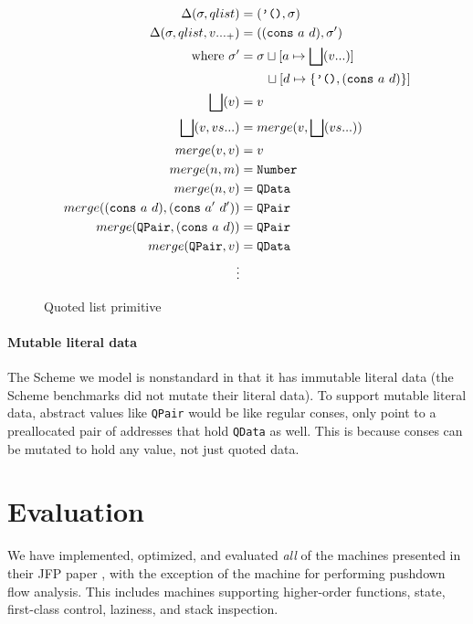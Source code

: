 \documentclass[preprint,onecolumn,9pt]{sigplanconf} %
\begin{document}
\begin{figure}
\begin{align*}
\Delta(\sigma, qlist) &= (\mbox{{\tt '()}}, \sigma) \\
\Delta(\sigma, qlist, v ..._+) &= (({\tt cons}\ a\ d), \sigma') \\
\qquad \mbox{where } \sigma' &= \sigma\sqcup[a \mapsto \bigsqcup(v ...)] \\
                            &\qquad \sqcup[d \mapsto \{ \mbox{{\tt '()}}, ({\tt cons}\ a\ d)\}] \\
\bigsqcup(v) &= v \\
\bigsqcup(v, vs ...) &= merge(v, \bigsqcup(vs ...)) \\
merge(v, v) &= v \\
merge(n, m) &= {\tt Number} \\
merge(n, v) &= {\tt QData} \\
merge(({\tt cons}\ a\ d), ({\tt cons}\ a'\ d')) &= {\tt QPair} \\
merge({\tt QPair}, ({\tt cons}\ a\ d)) &= {\tt QPair} \\
merge({\tt QPair}, v) &= {\tt QData} \\
\vdots
\end{align*}
\caption{Quoted list primitive}
\label{fig:qlist}
\end{figure}

\paragraph{Mutable literal data}
The Scheme we model is nonstandard in that it has immutable literal
data (the Scheme benchmarks did not mutate their literal data). To
support mutable literal data, abstract values like {\tt QPair} would
be like regular conses, only point to a preallocated pair of addresses
that hold {\tt QData} as well. This is because conses can be mutated
to hold any value, not just quoted data.

\section{Evaluation}
\label{sec:eval}

We have implemented, optimized, and evaluated \emph{all} of the
machines presented in their JFP paper
\cite{dvanhorn:VanHorn2012Systematic}, with the exception of the
machine for performing pushdown flow analysis.  This includes machines
supporting higher-order functions, state, first-class control,
laziness, and stack inspection.
\end{document}
